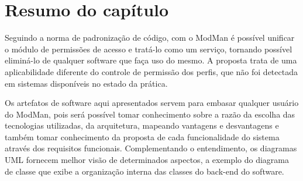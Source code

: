 \section{Resumo do capítulo}\label{sec:resumo} %


Seguindo a norma de padronização de código, com o ModMan é possível unificar o módulo de permissões de acesso e tratá-lo como um serviço, tornando possível eliminá-lo de qualquer software que faça uso do mesmo. A proposta trata de uma aplicabilidade diferente do controle de permissão dos perfis, que não foi detectada em sistemas disponíveis no estado da prática.

Os artefatos de software aqui apresentados servem para embasar qualquer usuário do ModMan, pois será possível tomar conhecimento sobre a razão da escolha das tecnologias utilizadas, da arquitetura, mapeando vantagens e desvantagens e também tomar conhecimento da proposta de cada funcionalidade do sistema através dos requisitos funcionais. Complementando o entendimento, os diagramas UML fornecem melhor visão de determinados aspectos, a exemplo do diagrama de classe que exibe a organização interna das classes do back-end do software.